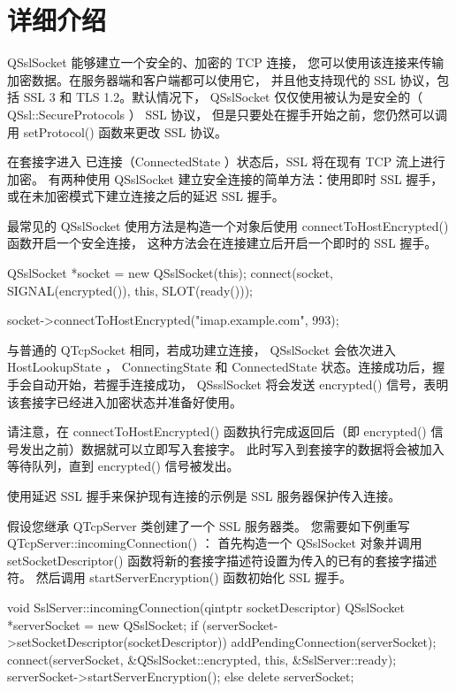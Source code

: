 \section{详细介绍}

QSslSocket 能够建立一个安全的、加密的 TCP 连接，
您可以使用该连接来传输加密数据。在服务器端和客户端都可以使用它，
并且他支持现代的 SSL 协议，包括 SSL 3 和 TLS 1.2。默认情况下，
QSslSocket 仅仅使用被认为是安全的（ QSsl::SecureProtocols ） SSL 协议，
但是只要处在握手开始之前，您仍然可以调用 setProtocol() 函数来更改 SSL 协议。

在套接字进入 已连接（ConnectedState ）状态后，SSL 将在现有 TCP 流上进行加密。
有两种使用 QSslSocket 建立安全连接的简单方法：使用即时 SSL 握手，
或在未加密模式下建立连接之后的延迟 SSL 握手。

最常见的 QSslSocket 使用方法是构造一个对象后使用 connectToHostEncrypted() 
函数开启一个安全连接，
这种方法会在连接建立后开启一个即时的 SSL 握手。

\begin{cppcode}
QSslSocket *socket = new QSslSocket(this);
connect(socket, SIGNAL(encrypted()), this, SLOT(ready()));

socket->connectToHostEncrypted("imap.example.com", 993);
\end{cppcode}

与普通的 QTcpSocket 相同，若成功建立连接， QSslSocket 会依次进入 HostLookupState ，
ConnectingState 和 ConnectedState 状态。连接成功后，握手会自动开始，若握手连接成功，
QSsslSocket 将会发送 encrypted() 信号，表明该套接字已经进入加密状态并准备好使用。

请注意，在 connectToHostEncrypted() 函数执行完成返回后（即 encrypted() 信号发出之前）数据就可以立即写入套接字。
此时写入到套接字的数据将会被加入等待队列，直到 encrypted() 信号被发出。

使用延迟 SSL 握手来保护现有连接的示例是 SSL 服务器保护传入连接。

假设您继承 QTcpServer 类创建了一个 SSL 服务器类。
您需要如下例重写 QTcpServer::incomingConnection() ：
首先构造一个 QSslSocket 对象并调用 setSocketDescriptor() 函数将新的套接字描述符设置为传入的已有的套接字描述符。
然后调用 startServerEncryption() 函数初始化 SSL 握手。

\begin{cppcode}
 void SslServer::incomingConnection(qintptr socketDescriptor)
 {
     QSslSocket *serverSocket = new QSslSocket;
     if (serverSocket->setSocketDescriptor(socketDescriptor)) {
         addPendingConnection(serverSocket);
         connect(serverSocket, &QSslSocket::encrypted, this, &SslServer::ready);
         serverSocket->startServerEncryption();
     } else {
         delete serverSocket;
     }
 }
\end{cppcode}

